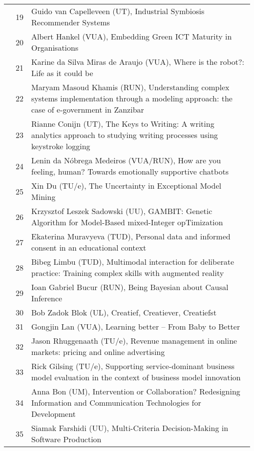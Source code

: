 \begin{xltabular}{\linewidth}{@{} l @{\hspace{0.5em}} l @{\hspace{1em}} X @{}}
	&	 19	&	 Guido van Capelleveen (UT), Industrial Symbiosis Recommender Systems \\
	&	 20	&	 Albert Hankel (VUA), Embedding Green ICT Maturity in Organisations \\
	&	 21	&	 Karine da Silva Miras de Araujo (VUA), Where is the robot?: Life as it could be \\
	&	 22	&	 Maryam Masoud Khamis (RUN), Understanding complex systems implementation through a modeling approach: the case of e-government in Zanzibar \\
	&	 23	&	 Rianne Conijn (UT), The Keys to Writing: A writing analytics approach to studying writing processes using keystroke logging \\
	&	 24	&	 Lenin da N\'{o}brega Medeiros (VUA/RUN), How are you feeling, human? Towards emotionally supportive chatbots \\
	&	 25	&	 Xin Du (TU/e), The Uncertainty in Exceptional Model Mining \\
	&	 26	&	 Krzysztof Leszek Sadowski (UU), GAMBIT: Genetic Algorithm for Model-Based mixed-Integer opTimization \\
	&	 27	&	 Ekaterina Muravyeva (TUD), Personal data and informed consent in an educational context \\
	&	 28	&	 Bibeg Limbu (TUD), Multimodal interaction for deliberate practice: Training complex skills with augmented reality \\
	&	 29	&	 Ioan Gabriel Bucur (RUN), Being Bayesian about Causal Inference \\
	&	 30	&	 Bob Zadok Blok (UL), Creatief, Creatiever, Creatiefst \\
	&	 31	&	 Gongjin Lan (VUA), Learning better -- From Baby to Better \\
	&	 32	& 	 Jason Rhuggenaath (TU/e), Revenue management in online markets: pricing and online advertising \\
	&	 33	& 	 Rick Gilsing (TU/e), Supporting service-dominant business model evaluation in the context of business model innovation \\
	&	 34	&	 Anna Bon (UM), Intervention or Collaboration? Redesigning Information and Communication Technologies for Development \\
	&	 35	&	 Siamak Farshidi (UU), Multi-Criteria Decision-Making in Software Production \\


\end{xltabular}
